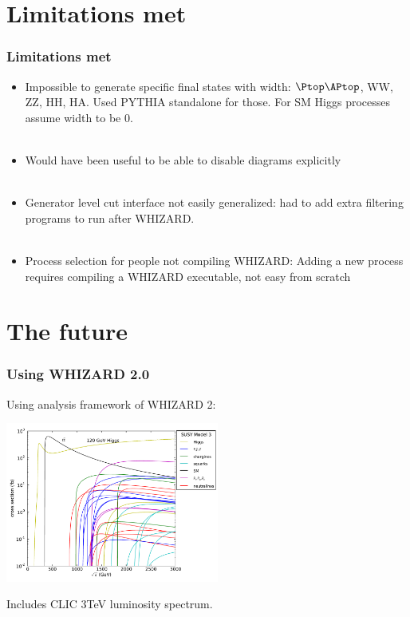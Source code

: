 \documentclass{beamer}
\newcommand{\whizard}{WHIZARD\xspace}
\begin{document}
\section{Limitations met}
\begin{frame}
\frametitle{Limitations met}
\begin{itemize}
  \item Impossible to generate specific final states with width: $\Ptop\APtop$,
  WW, ZZ, HH, HA. {\color{blue}Used PYTHIA standalone} for those. For SM Higgs
  processes assume width to be 0.\\
  ~\\
  \item Would have been useful to be able to {\color{blue}disable diagrams
  explicitly}\\
  ~\\
  \item Generator level cut interface not easily generalized: had to
  {\color{blue}add extra filtering programs} to run after \whizard.\\
  ~\\
  \item Process selection for people not compiling \whizard: Adding a
  {\color{blue}new process requires compiling a \whizard executable}, not easy
  from scratch
\end{itemize}
\end{frame}
\section{The future}
\begin{frame}
\frametitle{Using \whizard 2.0}
Using analysis framework of \whizard2:
\begin{center}
\includegraphics[width=7cm]{./model3.pdf}
\end{center}
Includes CLIC 3TeV luminosity spectrum.
\end{frame}
\end{document}

